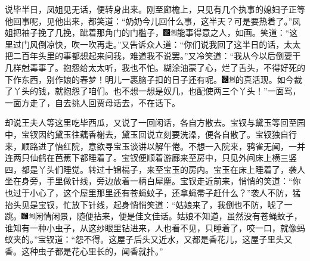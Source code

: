 说毕半日，凤姐见无话，便转身出来。刚至廊檐上，只见有几个执事的媳妇子正等他回事呢，见他出来，都笑道：“奶奶今儿回什么事，这半天？可是要热着了。”凤姐把袖子挽了几挽，跐着那角门的门槛子，{\includegraphics[width=3mm]{../Images/00006}\includegraphics[width=3mm]{../Images/00011}\footnotesize \kaishu 能事得意之人，如画。}笑道：“这里过门风倒凉快，吹一吹再走。”又告诉众人道：“你们说我回了这半日的话，太太把二百年头里的事都想起来问我，难道我不说罢。”又冷笑道：“我从今以后倒要干几样尅毒事了。抱怨给太太听，我也不怕。糊涂油蒙了心，烂了舌头，不得好死的下作东西，别作娘的春梦！明儿一裹脑子扣的日子还有呢。{\includegraphics[width=3mm]{../Images/00006}\includegraphics[width=3mm]{../Images/00011}\footnotesize \kaishu 的真活现。}如今裁了丫头的钱，就抱怨了咱们。也不想一想是奴几，也配使两三个丫头！”一面骂，一面方走了，自去挑人回贾母话去，不在话下。

却说王夫人等这里吃毕西瓜，又说了一回闲话，各自方散去。宝钗与黛玉等回至园中，宝钗因约黛玉往藕香榭去，黛玉回说立刻要洗澡，便各自散了。宝钗独自行来，顺路进了怡红院，意欲寻宝玉谈讲以解午倦。不想一入院来，鸦雀无闻，一并连两只仙鹤在芭蕉下都睡着了。宝钗便顺着游廊来至房中，只见外间床上横三竖四，都是丫头们睡觉。转过十锦槅子，来至宝玉的房内。宝玉在床上睡着了，袭人坐在身旁，手里做针线，旁边放着一柄白犀麈。宝钗走近前来，悄悄的笑道：“你也过于小心了，这个屋里那里还有苍蝇蚊子，还拿蝇帚子赶什么？”袭人不防，猛抬头见是宝钗，忙放下针线，起身悄悄笑道：“姑娘来了，我倒也不防，唬了一跳。{\includegraphics[width=3mm]{../Images/00006}\includegraphics[width=3mm]{../Images/00011}\footnotesize \kaishu 闲情闲景，随便拈来，便是佳文佳话。}姑娘不知道，虽然没有苍蝇蚊子，谁知有一种小虫子，从这纱眼里钻进来，人也看不见，只睡着了，咬一口，就像蚂蚁夹的。”宝钗道：“怨不得。这屋子后头又近水，又都是香花儿，这屋子里头又香。这种虫子都是花心里长的，闻香就扑。”

